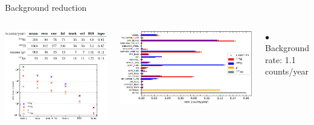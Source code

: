 \documentclass [aspectratio=169]{beamer}
\begin{document}
\begin{frame}{Background reduction}
\begin{columns}
\includegraphics[scale=0.55]{bkgndReduction.png}

\includegraphics[scale=0.50]{bkgndFinal.png}

$\bullet~$ Background rate: 1.1 counts/year

 \end{columns}
\end{frame}
\end{document}
